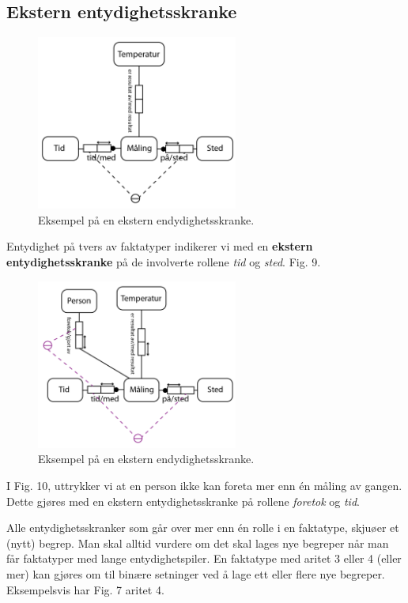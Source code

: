 \documentclass[11pt,a4paper]{article}
\begin{document}
\subsection{Ekstern entydighetsskranke}
\begin{figure}[h!]
	\centering
		\includegraphics[width=250px]{img/ents-01.png}
	\caption{Eksempel på en ekstern endydighetsskranke.}
\end{figure}

Entydighet på tvers av faktatyper indikerer vi med en \textbf{ekstern entydighetsskranke} på de involverte rollene \textit{tid} og \textit{sted}. Fig. 9.

\begin{figure}[h!]
	\centering
		\includegraphics[width=250px]{img/ents2-01.png}
	\caption{Eksempel på en ekstern endydighetsskranke.}
\end{figure}

I Fig. 10, uttrykker vi at en person ikke kan foreta mer enn én måling av gangen. Dette gjøres med en ekstern entydighetsskranke på rollene \textit{foretok} og \textit{tid}.

Alle entydighetsskranker som går over mer enn én rolle i en faktatype, skjuøer et (nytt) begrep. Man skal alltid vurdere om det skal lages nye begreper når man får faktatyper med lange entydighetspiler. En faktatype med aritet 3 eller 4 (eller mer) kan gjøres om til binære setninger ved å lage ett eller flere nye begreper. Eksempelsvis har Fig. 7 aritet 4.
\end{document}
